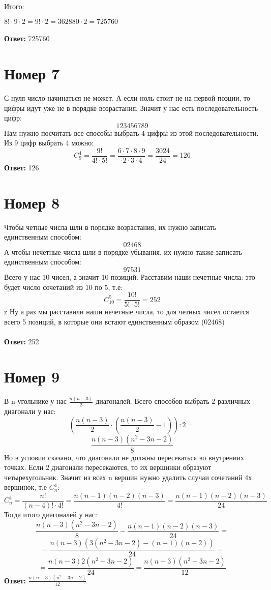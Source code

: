 \documentclass[a4paper,12pt]{article}
\begin{document}
Итого:

$8! \cdot 9 \cdot 2 = 9! \cdot 2 = 362880 \cdot 2 = 725760$
\\\\
\textbf{Ответ:} 725760

\section*{Номер 7}
С нуля число начинаться не может. А если ноль стоит не на первой позции, то цифры идут уже не в порядке возрастания. Значит у нас есть последовательность цифр:
\[
123456789
\]
Нам нужно посчитать все способы выбрать 4 цифры из этой последовательности. Из 9 цифр выбрать 4 можно:
\[
C^4_9 = \frac{9!}{4!\cdot5!} = \frac{6 \cdot 7 \cdot 8 \cdot 9}{ \cdot 2 \cdot 3 \cdot 4} = \frac{3024}{24} = 126
\]
\textbf{Ответ:} 126

\section*{Номер 8}
Чтобы четные числа шли в порядке возрастания, их нужно записать единственным способом:
\[
02468
\]
А чтобы нечетные числа шли в порядке убывания, их нужно также записать единственным способом:
\[
97531
\]
Всего у нас 10 чисел, а значит 10 позиций. Расставим наши нечетные числа: это будет число сочетаний из 10 по 5, т.е:
\[
C^5_{10} = \frac{10!}{5!\cdot5!} = 252
\]z
Ну а раз мы расставили наши нечетные числа, то для четных чисел остается всего 5 позиций, в которые они встают единственным образом (02468)
\\\\
\textbf{Ответ:} 252
\section*{Номер 9}
В n-угольнике у нас $\frac{n(n-3)}{2}$ диагоналей. Всего способов выбрать 2 различных диагонали у нас:
\[
\left( \frac{n(n-3)}{2} \cdot \left(  \frac{n(n-3)}{2} - 1 \right)  \right) : 2 = 
\]
\[
\frac{n(n-3)(n^2-3n-2)}{8}
\]
Но в условии сказано, что диагонали не должны пересекаться во внутрениих точках. Если 2 диагонали пересекаются, то их вершинки образуют четырехугольник. Значит из всех n вершин нужно удалить случаи сочетаний 4х вершинок,  т.е  $C_n^4$:
\[
C_n^4 = \frac{n!}{(n-4)! \cdot 4!} = \frac{n(n-1)(n-2)(n-3)}{4!} = \frac{n(n-1)(n-2)(n-3)}{24}
\]
Тогда итого диагоналей у нас:
\[
\frac{n(n-3)(n^2-3n-2)}{8} - \frac{n(n-1)(n-2)(n-3)}{24} =
\]
\[
= \frac{n(n-3)\left( 3(n^2-3n-2) - (n-1)(n-2) \right)}{24} = 
\]
\[
= \frac{n(n-3)2(n^2-3n-2)}{24} = \frac{n(n-3)(n^2-3n-2)}{12} 
\]
\textbf{Ответ:} $ \frac{n(n-3)(n^2-3n-2)}{12} $
\end{document}
